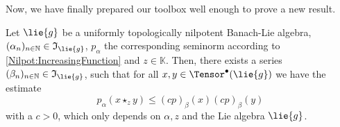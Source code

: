 Now, we have finally prepared our toolbox well enough to prove a new result.
\begin{proposition}
	\label{Nilpot:Prop:TopNilBanachLie}
	Let $\lie{g}$ be a uniformly topologically nilpotent Banach-Lie algebra,
	$(\alpha_n)_{n \in \mathbb{N}} \in \mathfrak{I}_{\lie{g}}$, $p_{\alpha}$ the 
	corresponding seminorm according to \eqref{Nilpot:IncreasingFunction} and 
	$z \in \mathbb{K}$. Then, there exists a series $(\beta_n)_{n \in \mathbb{N}} 
	\in \mathfrak{I}_{\lie{g}}$, such that for all $x,y \in \Tensor^{\bullet}
	(\lie{g})$ we have the estimate
	\begin{equation}
		\label{Nilpot:TopNilBanachLie}
		p_{\alpha} \left(
			x \star_z y
		\right)
		\leq
		(c p)_{\beta} (x)
		(c p)_{\beta} (y)
	\end{equation}
	with a $c > 0$, which only depends on $\alpha, z$ and the Lie algebra 
	$\lie{g}$.
\end{proposition}
